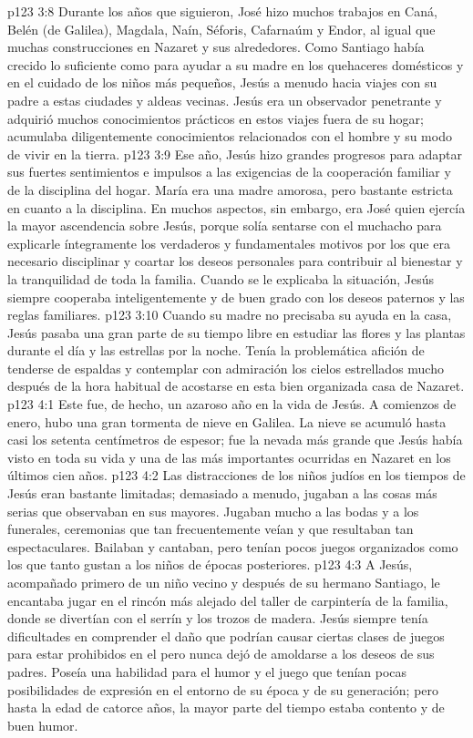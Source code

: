 \vs p123 3:8 Durante los años que siguieron, José hizo muchos trabajos en Caná, Belén (de Galilea), Magdala, Naín, Séforis, Cafarnaúm y Endor, al igual que muchas construcciones en Nazaret y sus alrededores. Como Santiago había crecido lo suficiente como para ayudar a su madre en los quehaceres domésticos y en el cuidado de los niños más pequeños, Jesús a menudo hacia viajes con su padre a estas ciudades y aldeas vecinas. Jesús era un observador penetrante y adquirió muchos conocimientos prácticos en estos viajes fuera de su hogar; acumulaba diligentemente conocimientos relacionados con el hombre y su modo de vivir en la tierra.
\vs p123 3:9 \pc Ese año, Jesús hizo grandes progresos para adaptar sus fuertes sentimientos e impulsos a las exigencias de la cooperación familiar y de la disciplina del hogar. María era una madre amorosa, pero bastante estricta en cuanto a la disciplina. En muchos aspectos, sin embargo, era José quien ejercía la mayor ascendencia sobre Jesús, porque solía sentarse con el muchacho para explicarle íntegramente los verdaderos y fundamentales motivos por los que era necesario disciplinar y coartar los deseos personales para contribuir al bienestar y la tranquilidad de toda la familia. Cuando se le explicaba la situación, Jesús siempre cooperaba inteligentemente y de buen grado con los deseos paternos y las reglas familiares.
\vs p123 3:10 \pc Cuando su madre no precisaba su ayuda en la casa, Jesús pasaba una gran parte de su tiempo libre en estudiar las flores y las plantas durante el día y las estrellas por la noche. Tenía la problemática afición de tenderse de espaldas y contemplar con admiración los cielos estrellados mucho después de la hora habitual de acostarse en esta bien organizada casa de Nazaret.
\vs p123 4:1 Este fue, de hecho, un azaroso año en la vida de Jesús. A comienzos de enero, hubo una gran tormenta de nieve en Galilea. La nieve se acumuló hasta casi los setenta centímetros de espesor; fue la nevada más grande que Jesús había visto en toda su vida y una de las más importantes ocurridas en Nazaret en los últimos cien años.
\vs p123 4:2 Las distracciones de los niños judíos en los tiempos de Jesús eran bastante limitadas; demasiado a menudo, jugaban a las cosas más serias que observaban en sus mayores. Jugaban mucho a las bodas y a los funerales, ceremonias que tan frecuentemente veían y que resultaban tan espectaculares. Bailaban y cantaban, pero tenían pocos juegos organizados como los que tanto gustan a los niños de épocas posteriores.
\vs p123 4:3 A Jesús, acompañado primero de un niño vecino y después de su hermano Santiago, le encantaba jugar en el rincón más alejado del taller de carpintería de la familia, donde se divertían con el serrín y los trozos de madera. Jesús siempre tenía dificultades en comprender el daño que podrían causar ciertas clases de juegos para estar prohibidos en el  pero nunca dejó de amoldarse a los deseos de sus padres. Poseía una habilidad para el humor y el juego que tenían pocas posibilidades de expresión en el entorno de su época y de su generación; pero hasta la edad de catorce años, la mayor parte del tiempo estaba contento y de buen humor.
